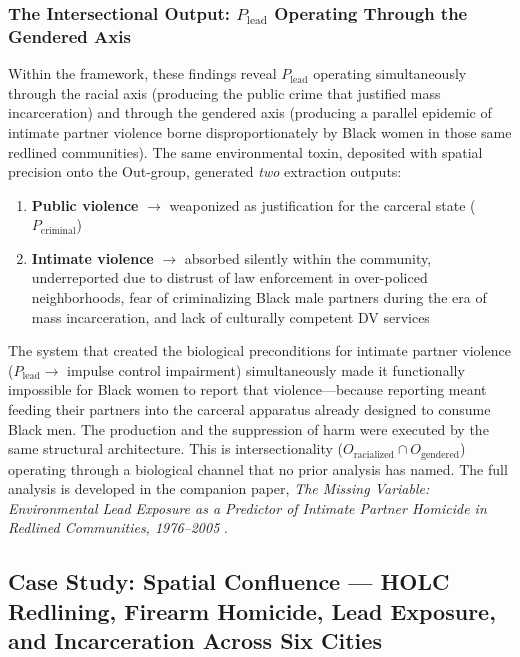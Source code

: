 \subsubsection{The Intersectional Output: \texorpdfstring{$P_{\text{lead}}$}{P\_lead} Operating Through the Gendered Axis}

Within the framework, these findings reveal $P_{\text{lead}}$ operating simultaneously through the racial axis (producing the public crime that justified mass incarceration) and through the gendered axis (producing a parallel epidemic of intimate partner violence borne disproportionately by Black women in those same redlined communities). The same environmental toxin, deposited with spatial precision onto the Out-group, generated \textit{two} extraction outputs:

\begin{enumerate}[nosep]
    \item \textbf{Public violence} $\rightarrow$ weaponized as justification for the carceral state ($P_{\text{criminal}}$)
    \item \textbf{Intimate violence} $\rightarrow$ absorbed silently within the community, underreported due to distrust of law enforcement in over-policed neighborhoods, fear of criminalizing Black male partners during the era of mass incarceration, and lack of culturally competent DV services
\end{enumerate}

The system that created the biological preconditions for intimate partner violence ($P_{\text{lead}} \rightarrow$ impulse control impairment) simultaneously made it functionally impossible for Black women to report that violence---because reporting meant feeding their partners into the carceral apparatus already designed to consume Black men. The production and the suppression of harm were executed by the same structural architecture. This is intersectionality ($O_{\text{racialized}} \cap O_{\text{gendered}}$) operating through a biological channel that no prior analysis has named. The full analysis is developed in the companion paper, \textit{The Missing Variable: Environmental Lead Exposure as a Predictor of Intimate Partner Homicide in Redlined Communities, 1976--2005} \cite{theodore_missing_variable}.

\FloatBarrier

\subsection*{Case Study: Spatial Confluence --- HOLC Redlining, Firearm Homicide, Lead Exposure, and Incarceration Across Six Cities}
\label{cs:spatial_confluence}

